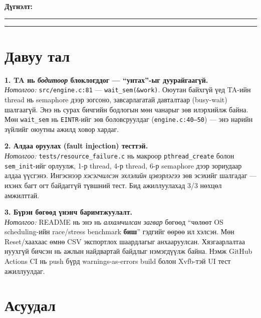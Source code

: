 \documentclass[11pt,a4paper]{article}
\begin{document}
\textbf{Дүгнэлт:}\\[3mm]
\noindent\rule{\textwidth}{0.4pt}

\vspace{2mm}\noindent\rule{\textwidth}{0.4pt}

\section{Давуу тал}

\textbf{1. TA нь \emph{бодитоор} блоклогддог --- ``унтах''-ыг дуурайгаагүй.}\\[2mm]
\emph{Нотолгоо:} \texttt{src/engine.c:81} --- \texttt{wait\_sem(\&work)}.
Оюутан байхгүй үед TA-ийн thread нь semaphore дээр зогсоно, завсарлагатай
давталтаар (busy-wait) шалгаагүй. Энэ нь сурах бичгийн бодлогын мөн чанарыг
зөв илэрхийлж байна. Мөн \texttt{wait\_sem} нь \texttt{EINTR}-ийг зөв
боловсруулдаг (\texttt{engine.c:40--50}) --- энэ нарийн зүйлийг оюутны ажилд
ховор хардаг.

\vspace{3mm}
\textbf{2. Алдаа оруулах (fault injection) тесттэй.}\\[2mm]
\emph{Нотолгоо:} \texttt{tests/resource\_failure.c} нь макроор
\texttt{pthread\_create} болон \texttt{sem\_init}-ийг орлуулж, 1-р thread,
4-р thread, 6-р semaphore дээр зориудаар алдаа үүсгэнэ. Ингэснээр
\emph{хэсэгчилсэн эхлэлийн цэвэрлэгээ} зөв эсэхийг шалгадаг --- ихэнх багт
огт байдаггүй түвшний тест. Бид ажиллуулахад 3/3 нөхцөл амжилттай.

\vspace{3mm}
\textbf{3. Бүрэн бөгөөд үнэнч баримтжуулалт.}\\[2mm]
\emph{Нотолгоо:} README нь энэ нь \emph{алхамчилсан загвар} бөгөөд ``чөлөөт
OS scheduling-ийн race/stress benchmark \textbf{биш}'' гэдгийг өөрөө ил
хэлсэн. Мөн Reset/хаахаас өмнө CSV экспортлох шаардлагыг анхааруулсан.
Хязгаарлалтаа нуухгүй бичсэн нь ажлын найдвартай байдлыг нэмэгдүүлж байна.
Нэмж GitHub Actions CI нь push бүрд warnings-as-errors build болон Xvfb-тэй
UI тест ажиллуулдаг.

\newpage
\section{Асуудал}
\end{document}
